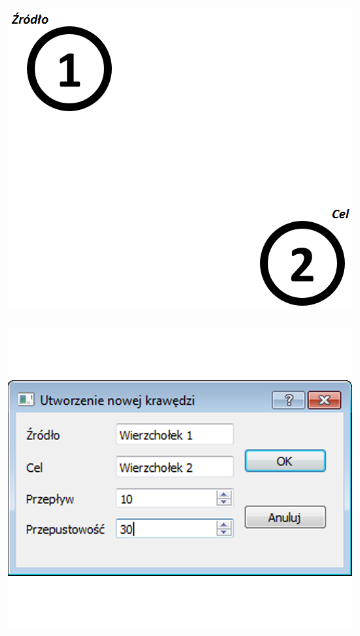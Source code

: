 \begin{figure}[h]
	\centering
	\begin{subfigure}{0.28\textwidth}
		\caption{}
		\includegraphics[width=0.9\linewidth]{./img/spec_zew03_1.png}
		\label{fig:addEdge1}
	\end{subfigure}\hfill
	\begin{subfigure}{0.28\textwidth}
		\caption{}
		\includegraphics[width=0.9\linewidth]{./img/spec_zew03_2.png}
		\label{fig:addEdge2}
	\end{subfigure}\hfill
	\begin{subfigure}{0.28\textwidth}
		\caption{}

\end{subfigure}
\end{figure}
